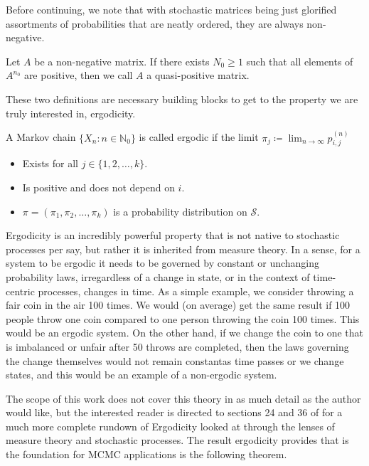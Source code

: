 Before continuing, we note that with stochastic matrices being just glorified assortments of probabilities that are neatly ordered, they are always non-negative. 

\begin{definition}
	Let $A$ be a non-negative matrix. If there exists $N_0 \geq 1$ such that all elements of $A^{n_0}$ are positive, then we call $A$ a quasi-positive matrix. 
\end{definition}

These two definitions are necessary building blocks to get to the property we are truly interested in, ergodicity. 

\begin{definition}
	A Markov chain $\{ X_n: n \in \mathbb{N}_0 \}$ is called ergodic if the limit $\pi_j \coloneqq \lim_{n \rightarrow \infty} p_{i,j}^{(n)}$
	\begin{itemize}
		\item Exists for all $j \in \{1,2,\ldots,k\}$. 
		\item Is positive and does not depend on $i$. 
		\item $\pi = (\pi_1 , \pi_2 , \ldots , \pi_k)$ is a probability distribution on $\mathcal{S}$. 
	\end{itemize}
\end{definition}

Ergodicity is an incredibly powerful property that is not native to stochastic processes per say, but rather it is inherited from measure theory. In a sense, for a system to be ergodic it needs to be governed by constant or unchanging probability laws, irregardless of a change in state, or in the context of time-centric processes, changes in time. As a simple example, we consider throwing a fair coin in the air 100 times. We would (on average) get the same result if 100 people throw one coin compared to one person throwing the coin 100 times. This would be an ergodic system. On the other hand, if we change the coin to one that is imbalanced or unfair after 50 throws are completed, then the laws governing the change themselves would not remain constantas time passes or we change states, and this would be an example of a non-ergodic system. 

The scope of this work does not cover this theory in as much detail as the author would like, but the interested reader is directed to sections 24 and 36 of \cite{billingsley2012probability} for a much more complete rundown of Ergodicity looked at through the lenses of measure theory and stochastic processes. The result ergodicity provides that is the foundation for MCMC applications is the following theorem. 


